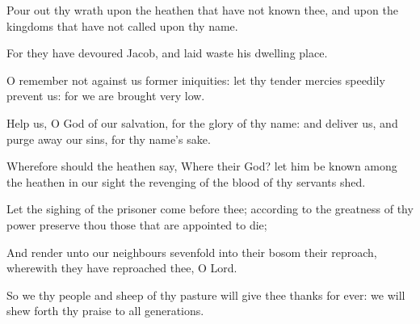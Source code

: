{\Q {}Pour
out thy
wrath upon the
heathen that have not
known thee, and upon the
kingdoms that have not
called upon thy
name.


\par }{\Q {}For they have
devoured
Jacob, and laid
waste his dwelling
place.


\par }{\Q {}O
remember not against us
former
iniquities: let thy tender
mercies
speedily
prevent us: for we are
brought
very
low.


\par }{\Q {}Help us, O
God of our
salvation,
for the
glory of thy
name: and
deliver us, and purge
away our
sins, for thy
name’s sake.


\par }{\Q {}Wherefore should the
heathen
say, Where
{} their
God? let him be
known among the
heathen in our
sight
{} the
revenging of the
blood of thy
servants
{}
shed.


\par }{\Q {}Let the
sighing of the
prisoner
come
before thee; according to the
greatness of thy
power
preserve thou those that are
appointed to
die;


\par }{\Q {}And
render unto our
neighbours
sevenfold into their
bosom their
reproach, wherewith they have
reproached thee, O
Lord.


\par }{\Q {}So we thy
people and
sheep of thy
pasture will give thee
thanks for
ever: we will shew
forth thy
praise to
all
generations.




\par }
